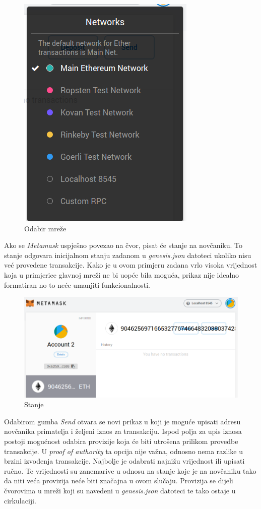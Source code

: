 \documentclass[times, utf8, zavrsni, numeric]{fer}
\begin{document}
\begin{figure}[ht]
  \includegraphics[scale=0.5]{mmnetworkdd.png}
  \caption{Odabir mreže}
  \centering
\end{figure}

Ako se \emph{Metamask} uspješno povezao na čvor, pisat će stanje na novčaniku. To stanje odgovara inicijalnom stanju zadanom u \emph{genesis.json} datoteci ukoliko
nisu već provedene transakcije. Kako je u ovom primjeru zadana vrlo visoka vrijednost koja u primjerice glavnoj mreži ne bi uopće bila moguća, prikaz nije idealno
formatiran no to neće umanjiti funkcionalnosti.

\begin{figure}[ht]
  \includegraphics[width=\textwidth]{mmimported.png}
  \caption{Stanje}
  \centering
\end{figure}

Odabirom gumba \emph{Send} otvara se novi prikaz u koji je moguće upisati adresu novčanika primatelja i željeni iznos za transakciju. Ispod polja za upis iznosa
postoji mogućnost odabira provizije koja će biti utrošena prilikom provedbe transakcije. U \emph{proof of authority} ta opcija nije važna, odnosno nema razlike u brzini
izvođenja transakcije. Najbolje je odabrati najnižu vrijednost ili upisati ručno. Te vrijednosti su zanemarive u odnosu na stanje koje je na novčaniku tako da niti veća
provizija neće biti značajna u ovom slučaju. Provizija se dijeli čvorovima u mreži koji su navedeni u \emph{genesis.json} datoteci te tako ostaje u cirkulaciji.
\end{document}
